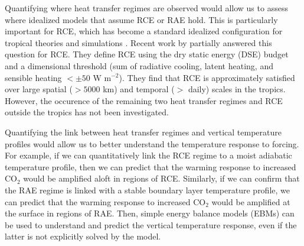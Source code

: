 \documentclass{ametsocV5}
\begin{document}
Quantifying where heat transfer regimes are observed would allow us to assess where idealized models that assume RCE or RAE hold. This is particularly important for RCE, which has become a standard idealized configuration for tropical theories \citep[e.g.,][]{emanuel1996,nilsson1999,romps2014,singh2015} and simulations \citep[][and the references therein]{wing2018}. Recent work by \cite{jakob2019} partially answered this question for RCE. They define RCE using the dry static energy (DSE) budget and a dimensional threshold (sum of radiative cooling, latent heating, and sensible heating $< \pm 50$ W m$^{-2}$). They find that RCE is approximately satisfied over large spatial ($>5000$ km) and temporal ($>$ daily) scales in the tropics. However, the occurence of the remaining two heat transfer regimes and RCE outside the tropics has not been investigated.



Quantifying the link between heat transfer regimes and vertical temperature profiles would allow us to better understand the temperature response to forcing. For example, if we can quantitatively link the RCE regime to a moist adiabatic temperature profile, then we can predict that the warming response to increased CO$_2$ would be amplified aloft in regions of RCE. Similarly, if we can confirm that the RAE regime is linked with a stable boundary layer temperature profile, we can predict that the warming response to increased CO$_2$ would be amplified at the surface in regions of RAE. Then, simple energy balance models (EBMs) can be used to understand and predict the vertical temperature response, even if the latter is not explicitly solved by the model.
\end{document}

